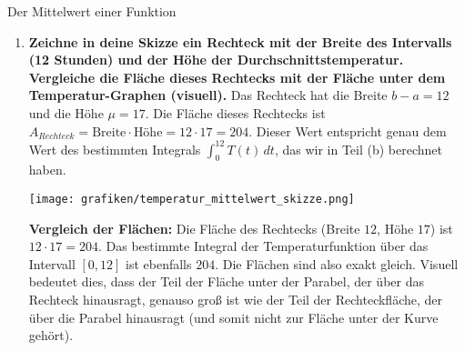 \begin{loesungsumgebung}{Der Mittelwert einer Funktion}
\begin{enumerate}[label=(\alph*)]
    \item \textbf{Zeichne in deine Skizze ein Rechteck mit der Breite des Intervalls (12 Stunden) und der Höhe der Durchschnittstemperatur. Vergleiche die Fläche dieses Rechtecks mit der Fläche unter dem Temperatur-Graphen (visuell).}
    Das Rechteck hat die Breite $b-a = 12$ und die Höhe $\mu = 17$.
    Die Fläche dieses Rechtecks ist $A_{Rechteck} = \text{Breite} \cdot \text{Höhe} = 12 \cdot 17 = 204$.
    Dieser Wert entspricht genau dem Wert des bestimmten Integrals $\int_{0}^{12} T(t) \,dt$, das wir in Teil (b) berechnet haben.

    \begin{center}
    \texttt{[image: grafiken/temperatur\_mittelwert\_skizze.png]}
    \label{fig:temperatur_mittelwert_skizze}
    \end{center}
    \textbf{Vergleich der Flächen:} Die Fläche des Rechtecks (Breite $12$, Höhe $17$) ist $12 \cdot 17 = 204$. Das bestimmte Integral der Temperaturfunktion über das Intervall $[0,12]$ ist ebenfalls $204$. Die Flächen sind also exakt gleich. Visuell bedeutet dies, dass der Teil der Fläche unter der Parabel, der über das Rechteck hinausragt, genauso groß ist wie der Teil der Rechteckfläche, der über die Parabel hinausragt (und somit nicht zur Fläche unter der Kurve gehört).
\end{enumerate}

\end{loesungsumgebung}

